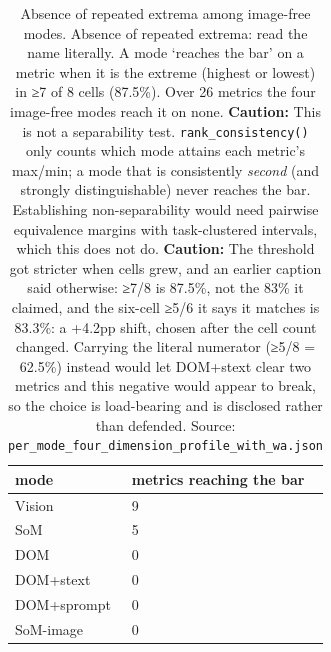 \begin{table}[tp]
\centering
\caption{Absence of repeated extrema among image-free modes. Absence of repeated extrema: read the name literally. A mode `reaches the bar' on a metric when it is the extreme (highest or lowest) in ≥7 of 8 cells (87.5\%). Over 26 metrics the four image-free modes reach it on none. \textbf{Caution:} This is not a separability test. \texttt{rank\_consistency()} only counts which mode attains each metric's max/min; a mode that is consistently \emph{second} (and strongly distinguishable) never reaches the bar. Establishing non-separability would need pairwise equivalence margins with task-clustered intervals, which this does not do. \textbf{Caution:} The threshold got stricter when cells grew, and an earlier caption said otherwise: ≥7/8 is 87.5\%, not the 83\% it claimed, and the six-cell ≥5/6 it says it matches is 83.3\%: a +4.2pp shift, chosen after the cell count changed. Carrying the literal numerator (≥5/8 = 62.5\%) instead would let DOM+stext clear two metrics and this negative would appear to break, so the choice is load-bearing and is disclosed rather than defended. Source: \texttt{per\_mode\_four\_dimension\_profile\_with\_wa.json}}
\label{tab:t05}
\footnotesize
\setlength{\tabcolsep}{3pt}
\begin{tabular}{@{}ll@{}}
\toprule
mode & metrics reaching the bar \\
\midrule
Vision & 9 \\
SoM & 5 \\
DOM & 0 \\
DOM+\allowbreak{}stext & 0 \\
DOM+\allowbreak{}sprompt & 0 \\
SoM-image & 0 \\
\bottomrule
\end{tabular}
\end{table}
